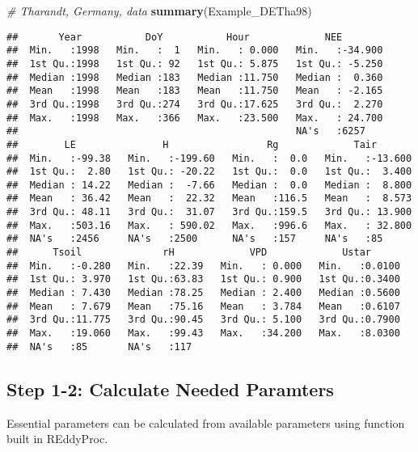 \documentclass[
]{article}
\newenvironment{Shaded}{\begin{snugshade}}{\end{snugshade}}
\newcommand{\CommentTok}[1]{\textcolor[rgb]{0.56,0.35,0.01}{\textit{#1}}}
\newcommand{\FunctionTok}[1]{\textcolor[rgb]{0.13,0.29,0.53}{\textbf{#1}}}
\newcommand{\NormalTok}[1]{#1}
\begin{document}
\begin{Shaded}
\begin{Highlighting}[]
\CommentTok{\# Tharandt, Germany, data}
\FunctionTok{summary}\NormalTok{(Example\_DETha98)}
\end{Highlighting}
\end{Shaded}

\begin{verbatim}
##       Year           DoY           Hour             NEE         
##  Min.   :1998   Min.   :  1   Min.   : 0.000   Min.   :-34.900  
##  1st Qu.:1998   1st Qu.: 92   1st Qu.: 5.875   1st Qu.: -5.250  
##  Median :1998   Median :183   Median :11.750   Median :  0.360  
##  Mean   :1998   Mean   :183   Mean   :11.750   Mean   : -2.165  
##  3rd Qu.:1998   3rd Qu.:274   3rd Qu.:17.625   3rd Qu.:  2.270  
##  Max.   :1998   Max.   :366   Max.   :23.500   Max.   : 24.700  
##                                                NA's   :6257     
##        LE               H                 Rg             Tair        
##  Min.   :-99.38   Min.   :-199.60   Min.   :  0.0   Min.   :-13.600  
##  1st Qu.:  2.80   1st Qu.: -20.22   1st Qu.:  0.0   1st Qu.:  3.400  
##  Median : 14.22   Median :  -7.66   Median :  0.0   Median :  8.800  
##  Mean   : 36.42   Mean   :  22.32   Mean   :116.5   Mean   :  8.573  
##  3rd Qu.: 48.11   3rd Qu.:  31.07   3rd Qu.:159.5   3rd Qu.: 13.900  
##  Max.   :503.16   Max.   : 590.02   Max.   :996.6   Max.   : 32.800  
##  NA's   :2456     NA's   :2500      NA's   :157     NA's   :85       
##      Tsoil              rH             VPD             Ustar       
##  Min.   :-0.280   Min.   :22.39   Min.   : 0.000   Min.   :0.0100  
##  1st Qu.: 3.970   1st Qu.:63.83   1st Qu.: 0.900   1st Qu.:0.3400  
##  Median : 7.430   Median :78.25   Median : 2.400   Median :0.5600  
##  Mean   : 7.679   Mean   :75.16   Mean   : 3.784   Mean   :0.6107  
##  3rd Qu.:11.775   3rd Qu.:90.45   3rd Qu.: 5.100   3rd Qu.:0.7900  
##  Max.   :19.060   Max.   :99.43   Max.   :34.200   Max.   :8.0300  
##  NA's   :85       NA's   :117
\end{verbatim}

\hypertarget{step-1-2-calculate-needed-paramters}{%
\subsection{Step 1-2: Calculate Needed
Paramters}\label{step-1-2-calculate-needed-paramters}}

Essential parameters can be calculated from available parameters using
function built in REddyProc.
\end{document}
